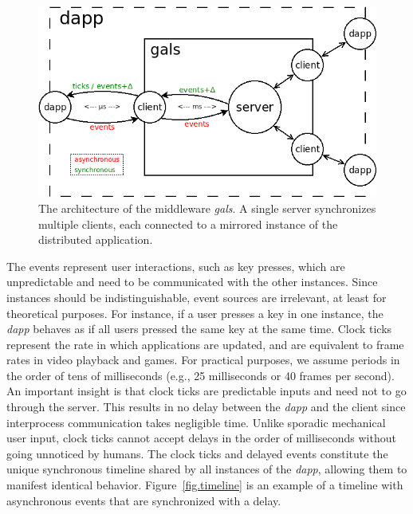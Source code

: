 \documentclass[sigplan,screen]{acmart}
\begin{document}
\begin{figure}[t]
  \centering
  \includegraphics[width=\linewidth]{middleware}
  \caption{
    \label{fig.middleware}
    The architecture of the middleware \emph{gals}.
    A single server synchronizes multiple clients, each connected to a mirrored
    instance of the distributed application.
  }
\end{figure}

The events represent user interactions, such as key presses, which are
unpredictable and need to be communicated with the other instances.
Since instances should be indistinguishable, event sources are irrelevant, at
least for theoretical purposes.
For instance, if a user presses a key in one instance, the \emph{dapp} behaves
as if all users pressed the same key at the same time.
%
Clock ticks represent the rate in which applications are updated, and are
equivalent to frame rates in video playback and games.
For practical purposes, we assume periods in the order of tens of milliseconds
(e.g., 25 milliseconds or 40 frames per second).
An important insight is that clock ticks are predictable inputs and need not to
go through the server.
This results in no delay between the \emph{dapp} and the client since
interprocess communication takes negligible time.
Unlike sporadic mechanical user input, clock ticks cannot accept delays in the
order of milliseconds without going unnoticed by humans.
%
The clock ticks and delayed events constitute the unique synchronous timeline
shared by all instances of the \emph{dapp}, allowing them to manifest identical
behavior.
Figure~\ref{fig.timeline} is an example of a timeline with asynchronous events
that are synchronized with a delay.
\end{document}
